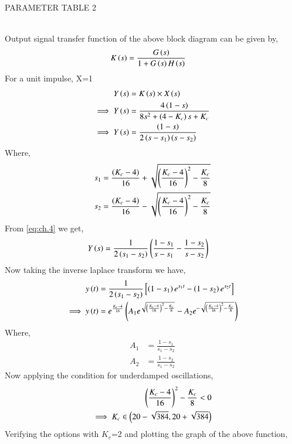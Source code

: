 \documentclass[journal,12pt,twocolumn]{IEEEtran}
\theoremstyle{remark}
\begin{document}
\begin{table}[ht]
    \centering
    
    \caption{PARAMETER TABLE 2}
    \label{tab:ch.45.2}
\end{table} \\
Output signal transfer function of the above block diagram can be given by,
\begin{align}
     K\left(s\right) &= \frac{G\left(s\right)}{1+G\left(s\right)H\left(s\right)}    
\end{align}
For a unit impulse, X=1
\begin{align}
    Y\left(s\right) &= K\left(s\right)\times X\left(s\right)   \\
    \implies Y\left(s\right) &= \frac{4\left(1-s\right)}{8s^2 + \left(4-K_c\right)s + K_c}  \\
    \implies Y\left(s\right) &= \frac{\left(1-s\right)}{2\left(s-s_1\right)\left(s-s_2\right)}  \label{eq:ch.4}
\end{align}
Where,
\begin{align}
    s_1 &= \frac{\left(K_c-4\right)}{16} + \sqrt{\left(\frac{K_c-4}{16}\right)^2 - \frac{K_c}{8}}  \\
    s_2 &= \frac{\left(K_c-4\right)}{16} - \sqrt{\left(\frac{K_c-4}{16}\right)^2 - \frac{K_c}{8}} 
\end{align}
From \eqref{eq:ch.4} we get,
\begin{align}
    Y\left(s\right) &= \frac{1}{2\left(s_1-s_2\right)}\left(\frac{1-s_1}{s-s_1}-\frac{1-s_2}{s-s_2}\right)
\end{align}
Now taking the inverse laplace transform we have,
\begin{align}
    y\left(t\right) &= \frac{1}{2\left(s_1-s_2\right)} \left [\left(1-s_1\right)e^{s_1t}-\left(1-s_2\right)e^{s_2t} \right ]  \\
    \implies y\left(t\right) &= e^{\frac{K_c-4}{16}}\left(A_1e^{\sqrt{\left(\frac{K_c-4}{16}\right)^2 - \frac{K_c}{8}}} - A_2e^{-\sqrt{\left(\frac{K_c-4}{16}\right)^2 - \frac{K_c}{8}}}\right)    
\end{align}
Where,
\begin{align}
    A_1 &= \frac{1-s_1}{s_1-s_2}    \\
    A_2 &= \frac{1-s_2}{s_1-s_2}    
\end{align}
Now applying the condition for underdamped oscillations,
\begin{align}
    \left(\frac{K_c-4}{16}\right)^2 - \frac{K_c}{8} < 0    \\
    \implies K_c \in \left(20-\sqrt{384} , 20+\sqrt{384}\right) 
\end{align}
Verifying the options with $K_c$=2 and plotting the graph of the above function,   \\
\end{document}

